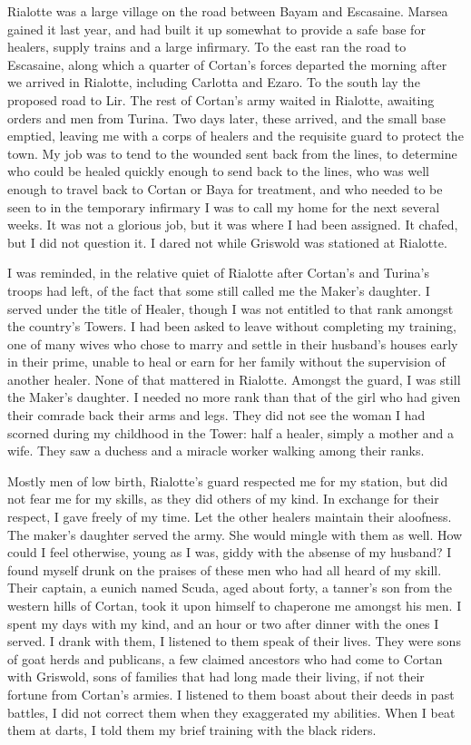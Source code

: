 \documentclass{article}
\begin{document}
Rialotte was a large village on the road between Bayam and Escasaine. Marsea gained it last year, and had built it up somewhat to provide a safe base for healers, supply trains and a large infirmary. To the east ran the road to Escasaine, along which a quarter of Cortan's forces departed the morning after we arrived in Rialotte, including Carlotta and Ezaro. To the south lay the proposed road to Lir. The rest of Cortan's army waited in Rialotte, awaiting orders and men from Turina. Two days later, these arrived, and the small base emptied, leaving me with a corps of healers and the requisite guard to protect the town. My job was to tend to the wounded sent back from the lines, to determine who could be healed quickly enough to send back to the lines, who was well enough to travel back to Cortan or Baya for treatment, and who needed to be seen to in the temporary infirmary I was to call my home for the next several weeks. It was not a glorious job, but it was where I had been assigned. It chafed, but I did not question it. I dared not while Griswold was stationed at Rialotte.

I was reminded, in the relative quiet of Rialotte after Cortan's and Turina's troops had left, of the fact that some still called me the Maker's daughter. I served under the title of Healer, though I was not entitled to that rank amongst the country's Towers. I had been asked to leave without completing my training, one of many wives who chose to marry and settle in their husband's houses early in their prime, unable to heal or earn for her family without the supervision of another healer. None of that mattered in Rialotte. Amongst the guard, I was still the Maker's daughter. I needed no more rank than that of the girl who had given their comrade back their arms and legs. They did not see the woman I had scorned during my childhood in the Tower: half a healer, simply a mother and a wife. They saw a duchess and a miracle worker walking among their ranks.

Mostly men of low birth, Rialotte's guard respected me for my station, but did not fear me for my skills, as they did others of my kind. In exchange for their respect, I gave freely of my time. Let the other healers maintain their aloofness. The maker's daughter served the army. She would mingle with them as well. How could I feel otherwise, young as I was, giddy with the absense of my husband? I found myself drunk on the praises of these men who had all heard of my skill. Their captain, a eunich named Scuda, aged about forty, a tanner's son from the western hills of Cortan, took it upon himself to chaperone me amongst his men. I spent my days with my kind, and an hour or two after dinner with the ones I served. I drank with them, I listened to them speak of their lives. They were sons of goat herds and publicans, a few claimed ancestors who had come to Cortan with Griswold, sons of families that had long made their living, if not their fortune from Cortan's armies.  I listened to them boast about their deeds in past battles, I did not correct them when they exaggerated my abilities. When I beat them at darts, I told them my brief training with the black riders. 
\end{document}

